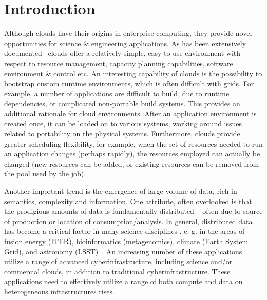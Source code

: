 \documentclass[times]{cpeauth}
\begin{document}

\maketitle


\vspace{-6pt}

\section{Introduction}
\vspace{-2pt}




Although clouds have their origins in enterprise computing, they
provide novel opportunities for science \& engineering applications.
As has been extensively documented~\cite{Jha:2010kx} clouds offer a
relatively simple, easy-to-use environment with respect to resource
management, capacity planning capabilities, software environment \&
control etc.  An interesting capability of clouds is the possibility
to bootstrap custom runtime environments, which is often difficult
with grids. For example, a number of applications are difficult to
build, due to runtime dependencies, or complicated non-portable build
systems. This provides an additional rationale for cloud
environments. After an application environment is created once, it can
be loaded on to various systems, working around issues related to
portability on the physical systems. Furthermore, clouds provide
greater scheduling flexibility, for example, when the set of resources
needed to run an application changes (perhaps rapidly), the resources
employed can actually be changed (new resources can be added, or
existing resources can be removed from the pool used by the job).


Another important trend is the emergence of large-volume of data, rich
in semantics, complexity and information. One attribute, often
overlooked is that the prodigious amounts of data is fundamentally
distributed -- often due to source of production or location of
consumption/analysis. In general, distributed data has become a
critical factor in many science disciplines \cite{fourthparadigm},
e. g. in the areas of fusion energy (ITER), bioinformatics
(metagenomics), climate (Earth System Grid), and astronomy
(LSST)~\cite{Jha:2011fk}. An increasing number of these applications
utilize a range of advanced cyberinfrastructure, including science
and/or commercial clouds, in addition to traditional
cyberinfrastructure.  These applications need to effectively utilize a
range of both compute and data on heterogeneous infrastructures rises.
\end{document}
